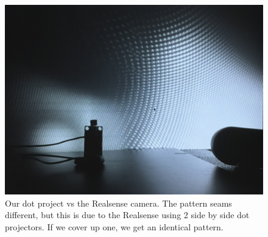 \begin{figure}[t]
\centering
\includegraphics[width=\textwidth]{figures/results/rsvsdiy}
\caption{Our dot  project vs the Realsense camera. The pattern seams different, but this is due to the Realsense using 2 side by side dot projectors. If we cover up one, we get an identical pattern.}
\label{fig:rsvsdiy}
\end{figure}
    
\onecolumn 